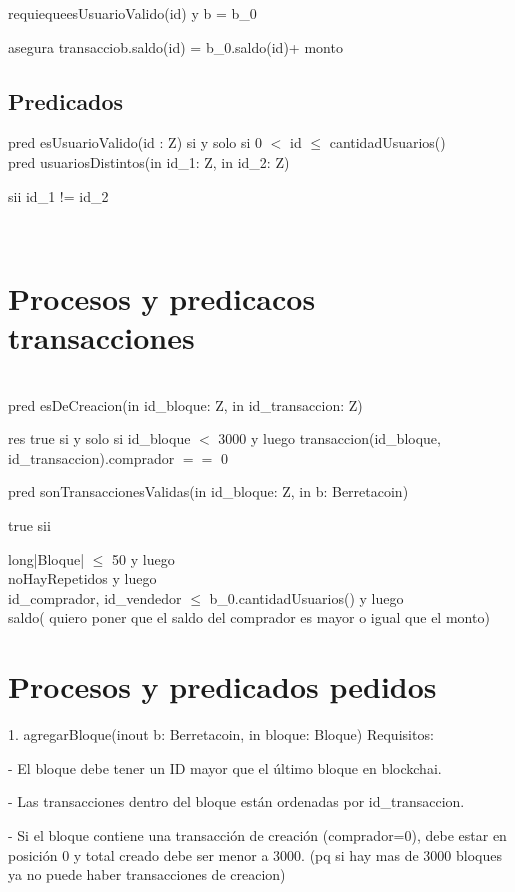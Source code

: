 \documentclass[10pt,a4paper]{article}
\begin{document}
{{    requieque{esUsuarioValido(id) y b = b_0}

    asegura{ transacciob.saldo(id) = b_0.saldo(id)+ monto}\\


\subsection{Predicados}
pred esUsuarioValido(id : Z){
    si y solo si  0 $<$ id $\leq$ cantidadUsuarios()
}\\

pred usuariosDistintos(in id_1: Z, in id_2: Z){

    sii id_1 != id_2
}\\




\section{Procesos y predicacos transacciones}


}\\
pred esDeCreacion(in id_bloque: Z, in id_transaccion: Z){

    res true si y solo si id_bloque $<$ 3000 y luego transaccion(id_bloque, id_transaccion).comprador $==$ 0

}

pred sonTransaccionesValidas(in id_bloque: Z, in b: Berretacoin){
    true sii {long|Bloque| $\leq$ 50 y luego\\
    noHayRepetidos y luego\\
    id_comprador, id_vendedor $\leq$ b_0.cantidadUsuarios() y luego\\
    saldo( quiero poner que el saldo del comprador es mayor o igual que el monto)
    
}

\section{Procesos y predicados pedidos}

1. agregarBloque(inout b: Berretacoin, in bloque: Bloque)
Requisitos:

    - El bloque debe tener un ID mayor que el último bloque en blockchai.

    - Las transacciones dentro del bloque están ordenadas por id_transaccion.

    - Si el bloque contiene una transacción de creación (comprador=0), debe estar en posición 0 y total creado debe ser menor a 3000. (pq si hay mas de 3000 bloques ya no puede haber transacciones de creacion)

}}
\end{document}
